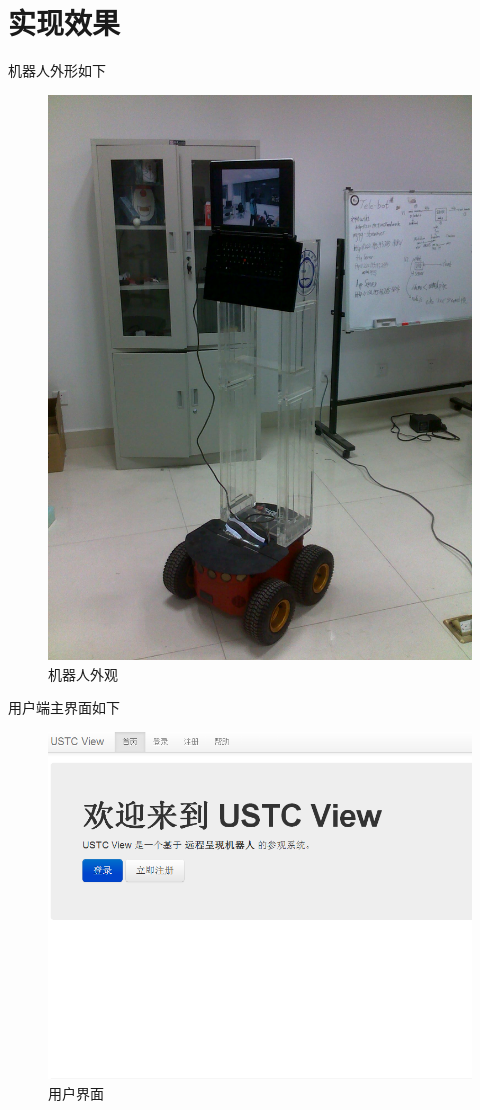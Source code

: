 \chapter{实现效果}

机器人外形如下

\begin{figure}[h]
        \centering
                \includegraphics[width=.70\textwidth]{Figures/ch9.outlook.jpg}
        \caption{机器人外观}
        \label{fig:outlook}
\end{figure}

用户端主界面如下

\begin{figure}[h]
        \centering
                \includegraphics[width=.70\textwidth]{Figures/ch9.ui.png}
        \caption{用户界面}
        \label{fig:UI}
\end{figure}

